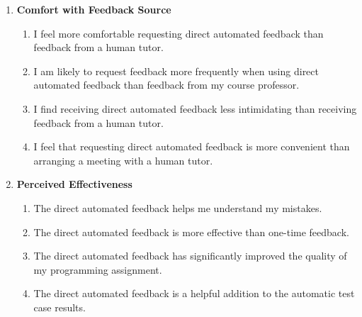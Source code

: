\documentclass[sigconf,screen,review,anonymous]{acmart}
\begin{document}
\begin{enumerate}[label=\textbf{RQ\arabic*}]
  \item \textbf{Comfort with Feedback Source}
  \begin{enumerate}[label=\textbf{Q\arabic*},resume,ref=Q\arabic*, leftmargin=*, itemindent=1.5em]
    \item \label{Q1} I feel more comfortable requesting direct automated feedback than feedback from a human tutor.
    \item \label{Q2} I am likely to request feedback more frequently when using direct automated feedback than feedback from my course professor.
    \item \label{Q3} I find receiving direct automated feedback less intimidating than receiving feedback from a human tutor.
    \item \label{Q4} I feel that requesting direct automated feedback is more convenient than arranging a meeting with a human tutor.
  \end{enumerate}
  \item \textbf{Perceived Effectiveness}
    \begin{enumerate}[label=\textbf{Q\arabic*},resume,ref=Q\arabic*, leftmargin=*, itemindent=1.5em]
      \item \label{Q5} The direct automated feedback helps me understand my mistakes.
      \item \label{Q6} The direct automated feedback is more effective than one-time feedback.
      \item \label{Q7} The direct automated feedback has significantly improved the quality of my programming assignment.
      \item \label{Q8} The direct automated feedback is a helpful addition to the automatic test case results.

\end{enumerate}
\end{enumerate}
\end{document}
